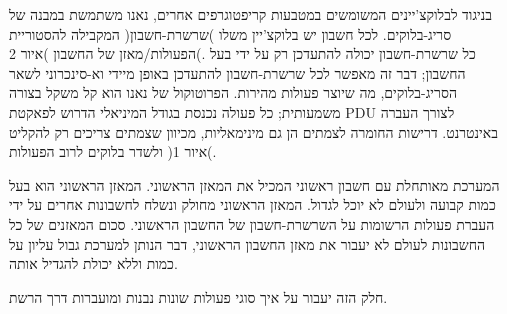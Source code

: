 בניגוד לבלוקצ'יינים המשומשים במטבעות קריפטוגרפים אחרים, נאנו משתמשת במבנה של סריג-בלוקים. לכל חשבון יש בלוקצ'יין משלו )שרשרת-חשבון( המקבילה להסטוריית הפעולות/מאזן של החשבון )איור 2(. כל שרשרת-חשבון יכולה להתעדכן רק על ידי בעל החשבון; דבר זה מאפשר לכל שרשרת-חשבון להתעדכן באופן מיידי וא-סינכרוני לשאר הסריג-בלוקים, מה שיוצר פעולות מהירות. הפרוטוקול של נאנו הוא קל משקל בצורה משמעותית; כל פעולה נכנסת בגודל המיניאלי הדרוש לפאקטת PDU לצורך העברה באינטרנט. דרישות החומרה לצמתים הן גם מינימאליות, מכיוון שצמתים צריכים רק להקליט ולשדר בלוקים לרוב הפעולות )איור 1(.

המערכת מאותחלת עם חשבון ראשוני   המכיל את המאזן הראשוני. המאזן הראשוני הוא בעל כמות קבועה ולעולם לא יוכל לגדול. המאזן הראשוני מחולק ונשלח לחשבונות אחרים על ידי העברת פעולות הרשומות על השרשרת-חשבון של החשבון הראשוני. סכום המאזנים של כל החשבונות לעולם לא יעבור את מאזן החשבון הראשוני, דבר הנותן למערכת גבול עליון על כמות וללא יכולת להגדיל אותה.

חלק הזה יעבור על איך סוגי פעולות שונות נבנות ומועברות דרך הרשת.

